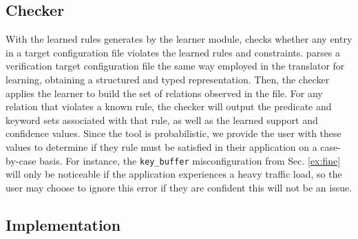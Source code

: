 \subsection{Checker}
\label{sec-checker}

With the learned rules generates by the learner module,
  \app checks whether any entry in a target configuration file violates the learned rules and constraints.
\app parses a verification target configuration file the same way employed in the translator for learning,
  obtaining a structured and typed representation.
Then, the checker applies the learner to build the set of relations observed in the file.
For any relation that violates a known rule, the checker will output the predicate and keyword sets associated with that rule, as well as the learned support and confidence values.
Since the tool is probabilistic, we provide the user with these values to determine if they rule must be satisfied in their application on a case-by-case basis.
For instance, the \texttt{key\_buffer} misconfiguration from Sec. \ref{ex:fine} will only be noticeable if the application experiences a heavy traffic load, so the user may choose to ignore this error if they are confident this will not be an issue.


\subsection{Implementation}



